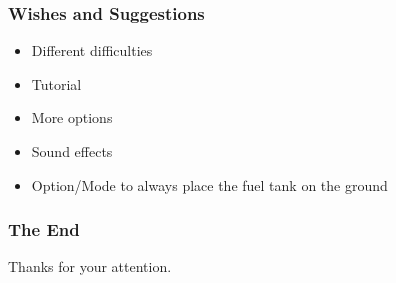\documentclass[xcolor=dvipsnames]{beamer}
\begin{document}
	\begin{frame}
		\frametitle{Wishes and Suggestions}
		\begin{itemize}
			\setlength\itemsep{2em}
			\item Different difficulties
			\item Tutorial
			\item More options
			\item Sound effects
			\item Option/Mode to always place the fuel tank on the ground
		\end{itemize}
	\end{frame}
	
		\begin{frame}
			\frametitle{The End}
			\centering
			\Huge
			Thanks for your attention.
		\end{frame}
\end{document}
